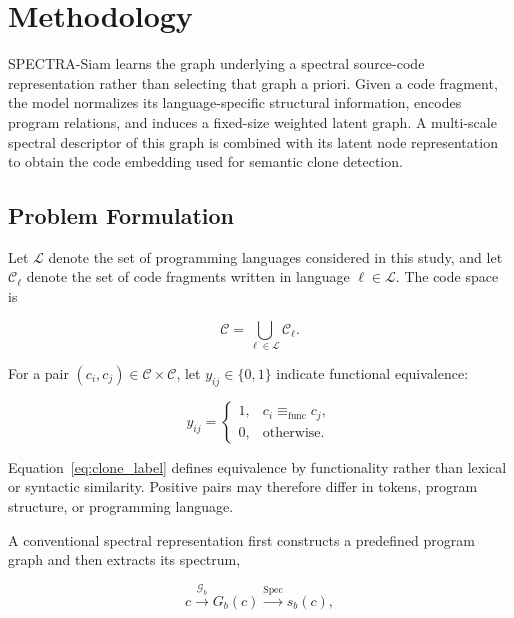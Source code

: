 \documentclass[authoryear,final,5p,times,twocolumn]{elsarticle}
\theoremstyle{plain}
\begin{document}
\section{Methodology}
\label{sec:methodology}

SPECTRA-Siam learns the graph underlying a spectral source-code representation
rather than selecting that graph a priori. Given a code fragment, the model
normalizes its language-specific structural information, encodes program
relations, and induces a fixed-size weighted latent graph. A multi-scale
spectral descriptor of this graph is combined with its latent node
representation to obtain the code embedding used for semantic clone detection.


\subsection{Problem Formulation}
\label{sec:problem_formulation}

Let $\mathcal{L}$ denote the set of programming languages considered in this
study, and let $\mathcal{C}_{\ell}$ denote the set of code fragments written
in language $\ell\in\mathcal{L}$. The code space is

\begin{equation}
\label{eq:code_space}
\mathcal{C}
=
\bigcup_{\ell\in\mathcal{L}}
\mathcal{C}_{\ell}.
\end{equation}

For a pair $(c_i,c_j)\in\mathcal{C}\times\mathcal{C}$, let
$y_{ij}\in\{0,1\}$ indicate functional equivalence:

\begin{equation}
\label{eq:clone_label}
y_{ij}
=
\begin{cases}
1, & c_i \equiv_{\mathrm{func}} c_j,\\
0, & \text{otherwise}.
\end{cases}
\end{equation}

Equation~\ref{eq:clone_label} defines equivalence by functionality rather than
lexical or syntactic similarity. Positive pairs may therefore differ in
tokens, program structure, or programming language.

A conventional spectral representation first constructs a predefined program
graph and then extracts its spectrum,

\begin{equation}
\label{eq:fixed_spectral_mapping}
c
\xrightarrow{\mathcal{G}_{b}}
G_b(c)
\xrightarrow{\operatorname{Spec}}
s_b(c),
\end{equation}
\end{document}
